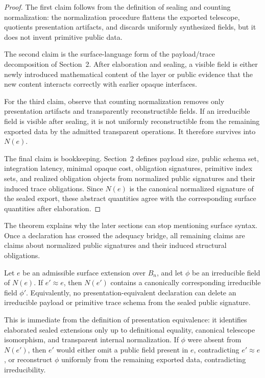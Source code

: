 \documentclass{lmcs}
\begin{document}
\begin{proof}
The first claim follows from the definition of sealing and counting normalization: the
normalization procedure flattens the exported telescope, quotients presentation artifacts, and
discards uniformly synthesized fields, but it does not invent primitive public data.

The second claim is the surface-language form of the payload/trace decomposition of
Section~2.  After elaboration and sealing, a visible field is either newly introduced
mathematical content of the layer or public evidence that the new content interacts correctly
with earlier opaque interfaces.

For the third claim, observe that counting normalization removes only presentation artifacts
and transparently reconstructible fields.  If an irreducible field is visible after sealing, it is
not uniformly reconstructible from the remaining exported data by the admitted transparent
operations.  It therefore survives into \(N(e)\).

The final claim is bookkeeping.  Section~2 defines payload size, public schema set,
integration latency, minimal opaque cost, obligation signatures, primitive index sets, and
realized obligation objects from normalized public signatures and their induced trace
obligations.  Since \(N(e)\) is the canonical normalized signature of the sealed export, these
abstract quantities agree with the corresponding surface quantities after elaboration.
\end{proof}

The theorem explains why the later sections can stop mentioning surface syntax.  Once a
declaration has crossed the adequacy bridge, all remaining claims are claims about normalized
public signatures and their induced structural obligations.

\begin{prop}
Let \(e\) be an admissible surface extension over \(B_n\), and let \(\phi\) be an irreducible
field of \(N(e)\).  If \(e'\approx e\), then \(N(e')\) contains a canonically corresponding
irreducible field \(\phi'\).  Equivalently, no presentation-equivalent declaration can delete an
irreducible payload or primitive trace schema from the sealed public signature.
\end{prop}

This is immediate from the definition of presentation equivalence: it identifies elaborated
sealed extensions only up to definitional equality, canonical telescope isomorphism, and
transparent internal normalization.  If \(\phi\) were absent from \(N(e')\), then \(e'\) would
either omit a public field present in \(e\), contradicting \(e'\approx e\), or reconstruct
\(\phi\) uniformly from the remaining exported data, contradicting irreducibility.
\end{document}
